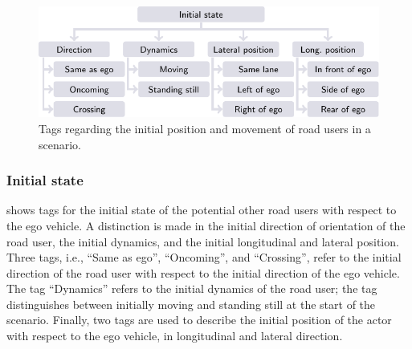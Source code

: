 \begin{figure}[t!]
	\centering
	\includegraphics{figures/initial_state}
	\caption{Tags regarding the initial position and movement of road users in a scenario.}
	\label{fig:tree initial state}
\end{figure}



\subsubsection{Initial state}
\label{sec:initial state}

 shows tags for the initial state of the potential other road users with respect to the ego vehicle. A distinction is made in the initial direction of orientation of the road user, the initial dynamics, and the initial longitudinal and lateral position. Three tags, i.e., ``Same as ego'', ``Oncoming'', and ``Crossing'', refer to the initial direction of the road user with respect to the initial direction of the ego vehicle. %
The tag ``Dynamics'' refers to the initial dynamics of the road user; the tag distinguishes between initially moving and standing still at the start of the scenario. 
Finally, two tags are used to describe the initial position of the actor with respect to the ego vehicle, in longitudinal and lateral direction. 

